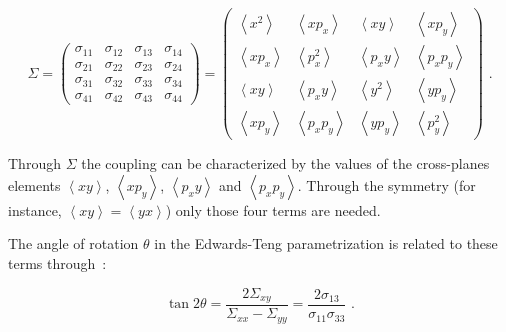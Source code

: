 \begin{equation}
    \Sigma = \begin{pmatrix} 
        \sigma_{11} & \sigma_{12} & \sigma_{13} & \sigma_{14} \\
        \sigma_{21} & \sigma_{22} & \sigma_{23} & \sigma_{24} \\
        \sigma_{31} & \sigma_{32} & \sigma_{33} & \sigma_{34} \\
        \sigma_{41} & \sigma_{42} & \sigma_{43} & \sigma_{44}
    \end{pmatrix} = \begin{pmatrix}
        \left\langle x^2 \right\rangle           &  \left\langle x p_x \right\rangle           &  \left\langle x y \right\rangle           &  \left\langle x p_y \right\rangle           \\
        \left\langle x p_x \right\rangle  &  \left\langle p_x^2 \right\rangle         &  \left\langle p_x y \right\rangle  &  \left\langle p_x p_y \right\rangle  \\
        \left\langle x y \right\rangle           &  \left\langle p_x y \right\rangle           &  \left\langle y^2 \right\rangle           &  \left\langle y p_y \right\rangle           \\
        \left\langle x p_y \right\rangle  &  \left\langle p_x p_y \right\rangle  &  \left\langle y p_y \right\rangle  &  \left\langle p_y^2 \right\rangle
    \end{pmatrix} \text{ .}
    \label{equation:4d_sigma_matrix}
\end{equation}
\vspace{1pt}

Through \(\Sigma\) the coupling can be characterized by the values of the cross-planes elements \(\left\langle x y \right\rangle\), \(\left\langle x p_y \right\rangle\), \(\left\langle p_x y \right\rangle\) and \(\left\langle p_x p_y \right\rangle\).
Through the symmetry (for instance, \(\left\langle x y \right\rangle = \left\langle y x \right\rangle\)) only those four terms are needed.

The angle of rotation \(\theta\) in the Edwards-Teng parametrization is related to these terms through~\cite{EPAC:Cai:Luminosity_of_Asymmetric_e+e-_Collider_with_Coupling_Lattices}:

\begin{equation}
    \tan{2 \theta} = \frac{2 \Sigma_{xy}}{\Sigma_{xx} - \Sigma_{yy}} = \frac{2 \sigma_{13}}{\sigma_{11} \sigma_{33}} \text{ .}
    \label{equation:edwards_teng_theta_to_sigma_matrix_terms}
\end{equation}

